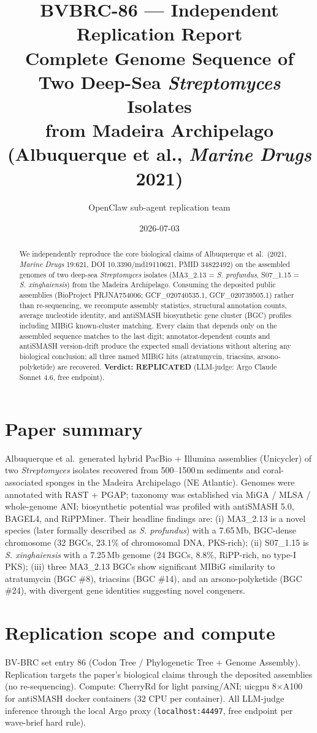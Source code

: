 \documentclass[11pt,letterpaper]{article}
\title{BVBRC-86 --- Independent Replication Report\\
\large Complete Genome Sequence of Two Deep-Sea \textit{Streptomyces} Isolates\\ from Madeira Archipelago (Albuquerque et al., \textit{Marine Drugs} 2021)}
\author{OpenClaw sub-agent replication team}
\date{2026-07-03}
\begin{document}
\maketitle

\begin{abstract}
We independently reproduce the core biological claims of Albuquerque et al.\ (2021, \textit{Marine Drugs} 19:621, DOI 10.3390/md19110621, PMID 34822492) on the assembled genomes of two deep-sea \textit{Streptomyces} isolates (MA3\_2.13 = \textit{S. profundus}, S07\_1.15 = \textit{S. xinghaiensis}) from the Madeira Archipelago. Consuming the deposited public assemblies (BioProject PRJNA754006; GCF\_020740535.1, GCF\_020739505.1) rather than re-sequencing, we recompute assembly statistics, structural annotation counts, average nucleotide identity, and antiSMASH biosynthetic gene cluster (BGC) profiles including MIBiG known-cluster matching. Every claim that depends only on the assembled sequence matches to the last digit; annotator-dependent counts and antiSMASH version-drift produce the expected small deviations without altering any biological conclusion; all three named MIBiG hits (atratumycin, triacsins, arsono-polyketide) are recovered. \textbf{Verdict: REPLICATED} (LLM-judge: Argo Claude Sonnet 4.6, free endpoint).
\end{abstract}

\section{Paper summary}
Albuquerque et al.\ generated hybrid PacBio + Illumina assemblies (Unicycler) of two \textit{Streptomyces} isolates recovered from 500--1500\,m sediments and coral-associated sponges in the Madeira Archipelago (NE Atlantic). Genomes were annotated with RAST + PGAP; taxonomy was established via MiGA / MLSA / whole-genome ANI; biosynthetic potential was profiled with antiSMASH 5.0, BAGEL4, and RiPPMiner. Their headline findings are: (i) MA3\_2.13 is a novel species (later formally described as \textit{S. profundus}) with a 7.65\,Mb, BGC-dense chromosome (32 BGCs, 23.1\% of chromosomal DNA, PKS-rich); (ii) S07\_1.15 is \textit{S. xinghaiensis} with a 7.25\,Mb genome (24 BGCs, 8.8\%, RiPP-rich, no type-I PKS); (iii) three MA3\_2.13 BGCs show significant MIBiG similarity to atratumycin (BGC \#8), triacsins (BGC \#14), and an arsono-polyketide (BGC \#24), with divergent gene identities suggesting novel congeners.

\section{Replication scope and compute}
BV-BRC set entry 86 (Codon Tree / Phylogenetic Tree + Genome Assembly). Replication targets the paper's biological claims through the deposited assemblies (no re-sequencing). Compute: CherryRd for light parsing/ANI; uicgpu 8$\times$A100 for antiSMASH docker containers (32 CPU per container). All LLM-judge inference through the local Argo proxy (\texttt{localhost:44497}, free endpoint per wave-brief hard rule).
\end{document}
